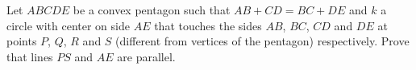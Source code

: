 Let $ ABCDE$ be a convex pentagon such that $ AB+CD=BC+DE$ and $ k$ a circle with center on side $ AE$ that touches the sides $ AB$, $ BC$, $ CD$ and $ DE$ at points $ P$, $ Q$, $ R$ and $ S$ (different from vertices of the pentagon) respectively. Prove that lines $ PS$ and $ AE$ are parallel.